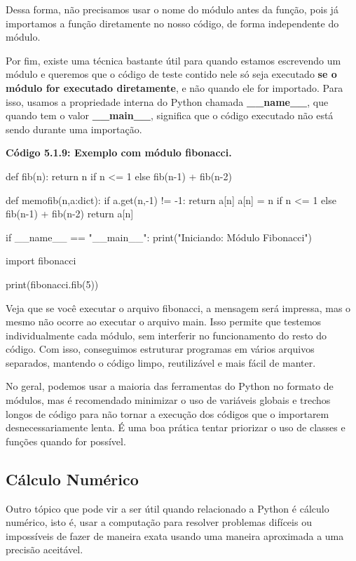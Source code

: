 \documentclass[11pt, a4paper]{article}
\begin{document}
Dessa forma, não precisamos usar o nome do módulo antes da função, pois já importamos a função diretamente no nosso código, de forma independente do módulo.

Por fim, existe uma técnica bastante útil para quando estamos escrevendo um módulo e queremos que o código de teste contido nele só seja executado \textbf{se o módulo for executado diretamente}, e não quando ele for importado. Para isso, usamos a propriedade interna do Python chamada \textbf{\_\_name\_\_}, que quando tem o valor \textbf{\_\_main\_\_}, significa que o código executado não está sendo durante uma importação.

\textbf{Código 5.1.9: Exemplo com módulo fibonacci.}

\begin{code}
def fib(n):
    return n if n <= 1 else fib(n-1) + fib(n-2)

def memofib(n,a:dict):
    if a.get(n,-1) != -1:
        return a[n]
    a[n] = n if n <= 1 else fib(n-1) + fib(n-2)
    return a[n]

if __name__ == "__main__":
    print("Iniciando: Módulo Fibonacci")
\end{code}

\begin{code}
import fibonacci

print(fibonacci.fib(5))
\end{code}

Veja que se você executar o arquivo fibonacci, a mensagem será impressa, mas o mesmo não ocorre ao executar o arquivo main. Isso permite que testemos individualmente cada módulo, sem interferir no funcionamento do resto do código. Com isso, conseguimos estruturar programas em vários arquivos separados, mantendo o código limpo, reutilizável e mais fácil de manter.

No geral, podemos usar a maioria das ferramentas do Python no formato de módulos, mas é recomendado minimizar o uso de variáveis globais e trechos longos de código para não tornar a execução dos códigos que o importarem desnecessariamente lenta. É uma boa prática tentar priorizar o uso de classes e funções quando for possível.

\subsection{Cálculo Numérico}

Outro tópico que pode vir a ser útil quando relacionado a Python é cálculo numérico, isto é, usar a computação para resolver problemas difíceis ou impossíveis de fazer de maneira exata usando uma maneira aproximada a uma precisão aceitável.
\end{document}
